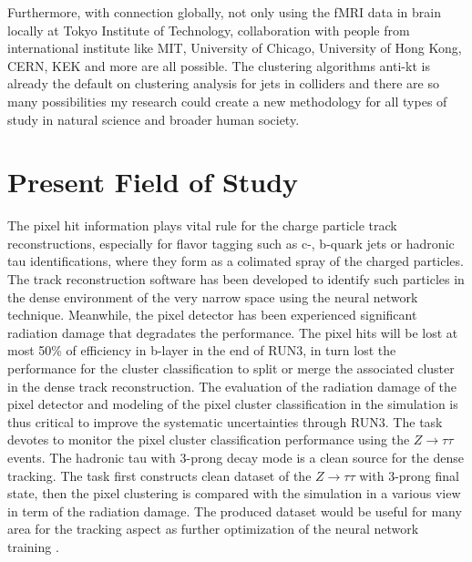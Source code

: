 \documentclass{article}
\begin{document}
Furthermore, with connection globally, not only using the fMRI data in brain locally 
at Tokyo Institute of Technology, collaboration with people from international 
institute like MIT, University of Chicago, University of Hong Kong, CERN, KEK and 
more are all possible. The clustering algorithms anti-kt is already the 
default on clustering analysis for jets in colliders and there are so 
many possibilities my research could create a new methodology for 
all types of study in natural science and broader human society. 


\section{Present Field of Study}

The pixel hit information plays vital rule for the charge particle track reconstructions,
especially for flavor tagging such as c-, b-quark jets or hadronic tau identifications, where
they form as a colimated spray of the charged particles. The track reconstruction software
has been developed to identify such particles in the dense environment of the very narrow
space using the neural network technique. Meanwhile, the pixel detector has been experienced
significant radiation damage that degradates the performance. The pixel hits will be lost at
most 50\% of efficiency in b-layer in the end of RUN3, in turn lost the performance for the
cluster classification to split or merge the associated cluster in the dense track reconstruction.
The evaluation of the radiation damage of the pixel detector and modeling of the pixel cluster
classification in the simulation is thus critical to improve the systematic uncertainties through
RUN3.
The task devotes to monitor the pixel cluster classification performance using the
$Z \rightarrow \tau \tau$ events. The hadronic tau with 3-prong decay mode is a clean source for the dense
tracking. The task first constructs clean dataset of the $Z \rightarrow \tau \tau$ with 3-prong final state, then
the pixel clustering is compared with the simulation in a various view in term of the radiation
damage. The produced dataset would be useful for many area for the tracking aspect as further
optimization of the neural network training \cite{pixel}.

\end{document}
